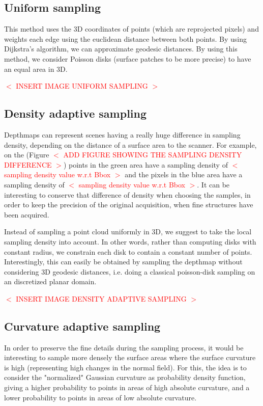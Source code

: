 \documentclass[11pt,fleqn]{book} %
\newcommand{\arnaud}[1]{\textcolor{red}{$<$ #1 $>$}}
\begin{document}
\subsection{Uniform sampling}
This method uses the 3D coordinates of points (which are reprojected pixels) and weights each edge using the euclidean distance between both points.
By using Dijkstra's algorithm, we can approximate geodesic distances. 
By using this method, we consider Poisson disks (surface patches to be more precise) to have an equal area in 3D.

\arnaud{INSERT IMAGE UNIFORM SAMPLING}

\subsection{Density adaptive sampling}
Depthmaps can represent scenes having a really huge difference in sampling density, depending on the distance of a surface area to the scanner. 
For example, on the (Figure \arnaud{ADD FIGURE SHOWING THE SAMPLING DENSITY DIFFERENCE}) points in the green area have a sampling density of \arnaud{sampling density value w.r.t Bbox} and the pixels in the blue area have a sampling density of \arnaud{sampling density value w.r.t Bbox}. It can be interesting to conserve that difference of density when choosing the samples, in order to keep the precision of the original acquisition, when fine structures have been acquired.

Instead of sampling a point cloud uniformly in 3D, we suggest to take the local sampling density into account. In other words, rather than computing disks with constant radius, we constrain each disk to contain a constant number of points.
Interestingly, this can easily be obtained by sampling the depthmap without considering 3D geodesic distances, i.e. doing a classical poisson-disk sampling on an discretized planar domain.

\arnaud{INSERT IMAGE DENSITY ADAPTIVE SAMPLING}

\subsection{Curvature adaptive sampling}
In order to preserve the fine details during the sampling process, it would be interesting to sample more densely the surface areas where the surface curvature is high (representing high changes in the normal field). For this, the idea is to consider the "normalized" Gaussian curvature as probability density function, giving a higher probability to points in areas of high absolute curvature, and a lower probability to points in areas of low absolute curvature.
\end{document}

